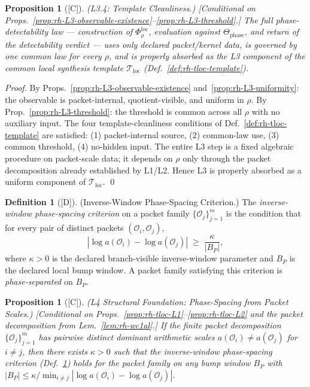 \documentclass[12pt,oneside]{amsbook}
\theoremstyle{plain}
\newtheorem{proposition}[theorem]{Proposition}
\theoremstyle{definition}
\newtheorem{definition}[theorem]{Definition}
\theoremstyle{remark}
\newcommand{\status}[1]{\textup{[#1]}}
\begin{document}
\begin{proposition}[\status{C}]\label{prop:rh-L3-template-clean}
\textup{(L3.4: Template Cleanliness.)}
\textup{[Conditional on Props.~\ref{prop:rh-L3-observable-existence}--\ref{prop:rh-L3-threshold}.]}
The full phase-detectability law --- construction of
$\Phi_\rho^{\mathrm{loc}}$, evaluation against
$\Theta_{\mathrm{phase}}$, and return of the detectability verdict
--- uses only declared packet/kernel data, is governed by one common
law for every $\rho$, and is properly absorbed as the L3 component of
the common local synthesis template $\mathcal{T}_{\mathrm{loc}}$
(Def.~\ref{def:rh-tloc-template}).
\end{proposition}

\begin{proof}
By Props.~\ref{prop:rh-L3-observable-existence}
and~\ref{prop:rh-L3-uniformity}: the observable is packet-internal,
quotient-visible, and uniform in $\rho$. By
Prop.~\ref{prop:rh-L3-threshold}: the threshold is common across
all $\rho$ with no auxiliary input. The four template-cleanliness
conditions of Def.~\ref{def:rh-tloc-template} are satisfied: (1)
packet-internal source, (2) common-law use, (3) common threshold,
(4) no-hidden input. The entire L3 step is a fixed algebraic
procedure on packet-scale data; it depends on $\rho$ only through
the packet decomposition already established by L1/L2. Hence L3 is
properly absorbed as a uniform component of
$\mathcal{T}_{\mathrm{loc}}$. \qed
\end{proof}





\begin{definition}[\status{D}]\label{def:rh-phase-spacing-criterion}
\textup{(Inverse-Window Phase-Spacing Criterion.)}
The \emph{inverse-window phase-spacing criterion} on a packet family
$\{\mathcal{O}_j\}_{j=1}^m$ is the condition that for every pair of
distinct packets $(\mathcal{O}_i, \mathcal{O}_j)$,
\[
 |\log a(\mathcal{O}_i) - \log a(\mathcal{O}_j)|
 \;\geq\; \frac{\kappa}{|B_P|},
\]
where $\kappa > 0$ is the declared branch-visible inverse-window
parameter and $B_P$ is the declared local bump window. A packet
family satisfying this criterion is \emph{phase-separated} on $B_P$.
\end{definition}

\begin{proposition}[\status{C}]\label{prop:rh-tloc-L4-structural}
\textup{(L4 Structural Foundation: Phase-Spacing from Packet Scales.)}
\textup{[Conditional on Props.~\ref{prop:rh-tloc-L1}--\ref{prop:rh-tloc-L2}
and the packet decomposition from Lem.~\ref{lem:rh-wc1al}.]}
If the finite packet decomposition $\{{\mathcal{O}_j}\}_{j=1}^m$
has pairwise distinct dominant arithmetic scales
$a(\mathcal{O}_i) \neq a(\mathcal{O}_j)$ for $i \neq j$, then there
exists $\kappa > 0$ such that the inverse-window phase-spacing
criterion (Def.~\ref{def:rh-phase-spacing-criterion}) holds for the
packet family on any bump window $B_P$ with
$|B_P| \leq \kappa / \min_{i \neq j}
|\log a(\mathcal{O}_i) - \log a(\mathcal{O}_j)|$.
\end{proposition}
\end{document}
